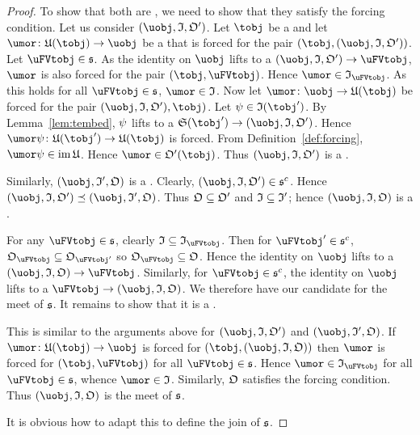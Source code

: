 \documentclass[%
12pt,%
arxiv,%
defaults
]{myclass}
\begin{document}
\begin{proof}
To show that both are \uFVtobjs, we need to show that they satisfy the  forcing condition.
Let us consider \((\uobj, \itest, \otest')\).
Let \(\tobj\) be a \tobj and let \(\umor \colon \ufunc(\tobj) \to \uobj\) be a \umor that is forced for the pair \((\tobj, (\uobj, \itest, \otest'))\).
Let \(\uFVtobj \in \family{S}\).
As the identity on \(\uobj\) lifts to a \uVtmor \((\uobj, \itest, \otest') \to \uFVtobj\), \(\umor\) is also forced for the pair \((\tobj, \uFVtobj)\).
Hence \(\umor \in \itest_{\uFVtobj}\).
As this holds for all \(\uFVtobj \in \family{S}\), \(\umor \in \itest\).
Now let \(\umor \colon \uobj \to \ufunc(\tobj)\) be forced for the pair \((\uobj, \itest, \otest'), \tobj)\).
Let \(\ifn \in \itest(\tobj')\).
By Lemma~\ref{lem:tembed}, \(\psi\) lifts to a \uVtmor \(\sfunc(\tobj') \to (\uobj, \itest, \otest')\).
Hence \(\umor \ifn \colon \ufunc(\tobj') \to \ufunc(\tobj)\) is forced.
From Definition~\ref{def:forcing}, \(\umor \ifn \in \im \ufunc\).
Hence \(\umor \in \otest'(\tobj)\).
Thus \((\uobj, \itest, \otest')\) is a \uFVtobj.

Similarly, \((\uobj, \itest', \otest)\) is a \uFVtobj.
Clearly, \((\uobj, \itest, \otest') \in \family{S}^c\).
Hence \((\uobj, \itest, \otest') \preceq (\uobj, \itest', \otest)\).
Thus \(\otest \subseteq \otest'\) and \(\itest \subseteq \itest'\); hence \((\uobj, \itest, \otest)\) is a \uVtobj.

For any \(\uFVtobj \in \family{S}\), clearly \(\itest \subseteq \itest_{\uFVtobj}\).
Then for \(\uFVtobj' \in \family{S}^c\), \(\otest_{\uFVtobj} \subseteq \otest_{\uFVtobj'}\) so \(\otest_{\uFVtobj} \subseteq \otest\).
Hence the identity on \(\uobj\) lifts to a \uVtmor \((\uobj, \itest, \otest) \to \uFVtobj\).
Similarly, for \(\uFVtobj \in \family{S}^c\), the identity on \(\uobj\) lifts to a \uVtmor \(\uFVtobj \to (\uobj, \itest, \otest)\).
We therefore have our candidate for the meet of \(\family{S}\).
It remains to show that it is a \uFVtobj.

This is similar to the arguments above for \((\uobj, \itest, \otest')\) and \((\uobj, \itest', \otest)\).
If \(\umor \colon \ufunc(\tobj) \to \uobj\) is forced for \((\tobj, (\uobj, \itest, \otest))\) then \(\umor\) is forced for \((\tobj, \uFVtobj)\) for all \(\uFVtobj \in \family{S}\).
Hence \(\umor \in \itest_{\uFVtobj}\) for all \(\uFVtobj \in \family{S}\), whence \(\umor \in \itest\).
Similarly, \(\otest\) satisfies the forcing condition.
Thus \((\uobj, \itest, \otest)\) is the meet of \(\family{S}\).

It is obvious how to adapt this to define the join of \(\family{S}\).
\end{proof}
\end{document}
